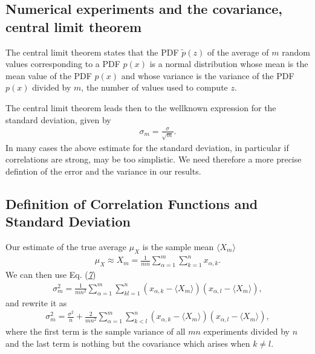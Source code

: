 \documentclass[letterpaper,10pt,english]{sphinxmanual}
\begin{document}
\subsection{Numerical experiments and the covariance, central limit theorem}
\label{\detokenize{chapter3:numerical-experiments-and-the-covariance-central-limit-theorem}}
The central limit theorem states that the PDF \(\tilde{p}(z)\) of
the average of \(m\) random values corresponding to a PDF \(p(x)\)
is a normal distribution whose mean is the
mean value of the PDF \(p(x)\) and whose variance is the variance
of the PDF \(p(x)\) divided by \(m\), the number of values used to compute \(z\).

The central limit theorem leads then to the well\sphinxhyphen{}known expression for the
standard deviation, given by
\begin{equation*}
\begin{split}
\sigma_m=
\frac{\sigma}{\sqrt{m}}.
\end{split}
\end{equation*}
In many cases the above estimate for the standard deviation, in particular if correlations are strong, may be too simplistic.  We need therefore a more precise defintion of the error and the variance in our results.


\subsection{Definition of Correlation Functions and Standard Deviation}
\label{\detokenize{chapter3:definition-of-correlation-functions-and-standard-deviation}}
Our estimate of the true average \(\mu_{X}\) is the sample mean \(\langle X_m \rangle\)
\begin{equation*}
\begin{split}
\mu_{X}^{\phantom X} \approx X_m=\frac{1}{mn}\sum_{\alpha=1}^m\sum_{k=1}^n x_{\alpha,k}.
\end{split}
\end{equation*}
We can then use Eq. ({\hyperref[\detokenize{chapter3:eq:exptvariance}]{\emph{7}}})
\begin{equation*}
\begin{split}
\sigma^2_m=\frac{1}{mn^2}\sum_{\alpha=1}^m\sum_{kl=1}^n (x_{\alpha,k}-\langle X_m \rangle)(x_{\alpha,l}-\langle X_m \rangle),
\end{split}
\end{equation*}
and rewrite it as
\begin{equation*}
\begin{split}
\sigma^2_m=\frac{\sigma^2}{n}+\frac{2}{mn^2}\sum_{\alpha=1}^m\sum_{k<l}^n (x_{\alpha,k}-\langle X_m \rangle)(x_{\alpha,l}-\langle X_m \rangle),
\end{split}
\end{equation*}
where the first term is the sample variance of all \(mn\) experiments divided by \(n\)
and the last term is nothing but the covariance which arises when \(k\ne l\).
\end{document}
